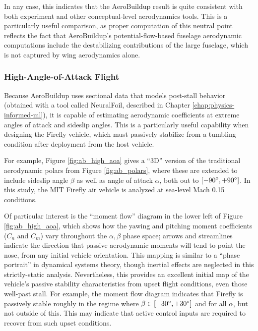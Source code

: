 In any case, this indicates that the AeroBuildup result is quite consistent with both experiment and other conceptual-level aerodynamics tools. This is a particularly useful comparison, as proper computation of this neutral point reflects the fact that AeroBuildup's potential-flow-based fuselage aerodynamic computations include the destabilizing contributions of the large fuselage, which is not captured by wing aerodynamics alone.

\subsubsection{High-Angle-of-Attack Flight}

Because AeroBuildup uses sectional data that models post-stall behavior (obtained with a tool called NeuralFoil, described in Chapter \ref{chap:physics-informed-ml}), it is capable of estimating aerodynamic coefficients at extreme angles of attack and sideslip angles. This is a particularly useful capability when designing the Firefly vehicle, which must passively stabilize from a tumbling condition after deployment from the host vehicle.

For example, Figure \ref{fig:ab_high_aoa} gives a ``3D'' version of the traditional aerodynamic polars from Figure \ref{fig:ab_polars}, where these are extended to include sideslip angle $\beta$ as well as angle of attack $\alpha$, both out to $[-90\degree, +90\degree]$. In this study, the MIT Firefly air vehicle is analyzed at sea-level Mach 0.15 conditions.

Of particular interest is the ``moment flow'' diagram in the lower left of Figure \ref{fig:ab_high_aoa}, which shows how the yawing and pitching moment coefficients ($C_n$ and $C_m$) vary throughout the $\alpha, \beta$ phase space; arrows and streamlines indicate the direction that passive aerodynamic moments will tend to point the nose, from any initial vehicle orientation. This mapping is similar to a ``phase portrait'' in dynamical systems theory, though inertial effects are neglected in this strictly-static analysis. Nevertheless, this provides an excellent initial map of the vehicle's passive stability characteristics from upset flight conditions, even those well-past stall. For example, the moment flow diagram indicates that Firefly is passively stable roughly in the regime where $\beta \in [-30\degree, +30\degree]$ and for all $\alpha$, but not outside of this. This may indicate that active control inputs are required to recover from such upset conditions.

